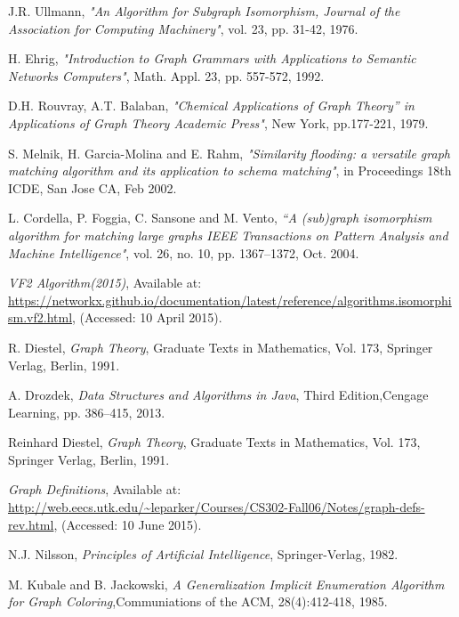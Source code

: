 
 \begin{thebibliography}{19}

	J.R. Ullmann, 
	\emph{"An Algorithm for Subgraph Isomorphism, Journal of the Association for Computing Machinery"},
	vol. 23, pp. 31-42, 1976.

	H. Ehrig, 
	\emph{"Introduction to Graph Grammars with Applications to Semantic Networks Computers"},
	Math. Appl. 23, pp. 557-572, 1992.

	D.H. Rouvray, A.T. Balaban, 
	\emph{"Chemical Applications of Graph Theory” in Applications of Graph Theory Academic Press"},
	New York, pp.177-221, 1979.

	S. Melnik, H. Garcia-Molina and E. Rahm, 
	\emph{"Similarity flooding: a versatile graph matching algorithm and its application to schema matching"},
	in Proceedings 18th ICDE, San Jose
	CA, Feb 2002.
	
	L. Cordella, P. Foggia, C. Sansone and M. Vento, 
	\emph{“A (sub)graph isomorphism algorithm for matching large graphs IEEE Transactions on Pattern Analysis and Machine Intelligence"},
	vol. 26, no. 10, pp. 1367–1372, Oct. 2004.

	\emph{VF2 Algorithm(2015)},
	Available at: \url{https://networkx.github.io/documentation/latest/reference/algorithms.isomorphism.vf2.html},
	(Accessed: 10 April 2015).
	
	R. Diestel, 
	\emph{Graph Theory},
	Graduate Texts in Mathematics,
	Vol. 173, Springer Verlag, Berlin, 1991.

	A. Drozdek, 
	\emph{Data Structures and Algorithms in Java},
	Third Edition,Cengage Learning, pp. 386–415, 2013.	

	Reinhard Diestel, 
	\emph{Graph Theory},
	Graduate Texts in Mathematics,
	Vol. 173, Springer Verlag, Berlin, 1991.

	\emph{Graph Definitions},
	Available at: \url{http://web.eecs.utk.edu/~leparker/Courses/CS302-Fall06/Notes/graph-defs-rev.html},
	(Accessed: 10 June 2015).

	N.J. Nilsson, 
	\emph{Principles of Artificial Intelligence},
	Springer-Verlag, 1982.	

	M. Kubale and B. Jackowski, 
	\emph{A Generalization Implicit Enumeration Algorithm for Graph Coloring},Communiations of the ACM, 28(4):412-418, 1985.


\end{thebibliography}
